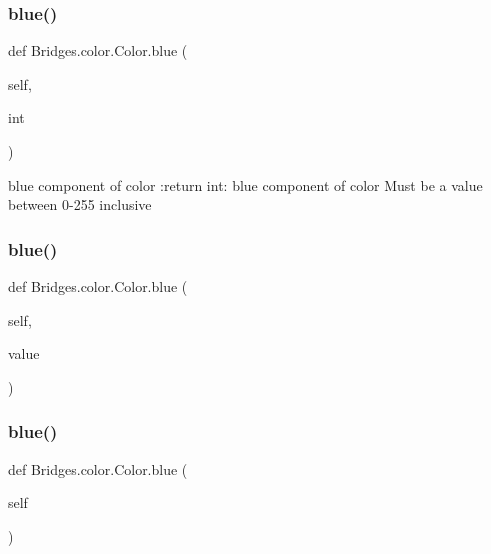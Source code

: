 \mbox{\label{class_bridges_1_1color_1_1_color_a0c7174e0cc79f94bba0378e80afd416b}} 
\subsubsection{\texorpdfstring{blue()}{blue()}\hspace{0.1cm}{\footnotesize\ttfamily [1/3]}}
{\footnotesize\ttfamily def Bridges.\+color.\+Color.\+blue (\begin{DoxyParamCaption}\item[{}]{self,  }\item[{}]{int }\end{DoxyParamCaption})}

\begin{DoxyVerb}blue component of color
:return int: blue component of color
Must be a value between 0-255 inclusive
\end{DoxyVerb}
 \mbox{\label{class_bridges_1_1color_1_1_color_ae13a368cd4278e676227526afe69c1ad}} 
\subsubsection{\texorpdfstring{blue()}{blue()}\hspace{0.1cm}{\footnotesize\ttfamily [2/3]}}
{\footnotesize\ttfamily def Bridges.\+color.\+Color.\+blue (\begin{DoxyParamCaption}\item[{}]{self,  }\item[{}]{value }\end{DoxyParamCaption})}

\mbox{\label{class_bridges_1_1color_1_1_color_a0c7174e0cc79f94bba0378e80afd416b}} 
\subsubsection{\texorpdfstring{blue()}{blue()}\hspace{0.1cm}{\footnotesize\ttfamily [3/3]}}
{\footnotesize\ttfamily def Bridges.\+color.\+Color.\+blue (\begin{DoxyParamCaption}\item[{}]{self }\end{DoxyParamCaption})}

